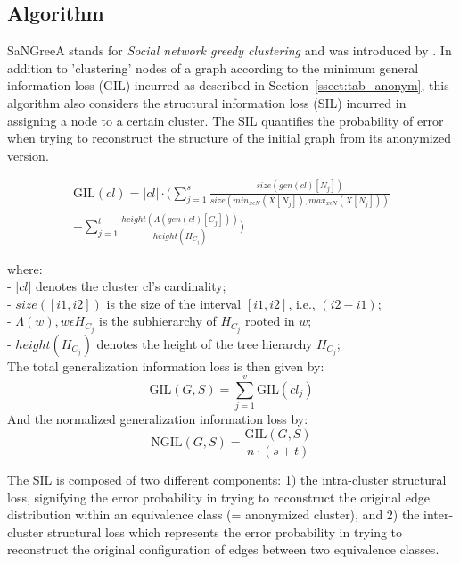 \documentclass{llncs}
\providecommand{\abs}[1]{\lvert#1\rvert}
\begin{document}
\subsection{Algorithm}
\label{ssect:algorithm}

SaNGreeA stands for \textit{Social network greedy clustering} and was introduced by \cite{campan2009data}. In addition to 'clustering' nodes of a graph according to the minimum general information loss (GIL) incurred as described in Section~\ref{ssect:tab_anonym}, this algorithm also considers the structural information loss (SIL) incurred in assigning a node to a certain cluster. The SIL quantifies the probability of error when trying to reconstruct the structure of the initial graph from its anonymized version.

\begin{equation*}
\begin{split}
\text{GIL}(cl) = \abs{cl} \cdot (\sum_{j=1}^{s} \frac{size(gen(cl)[N_j])}{size(min_{x \epsilon N} (X[N_j]), max_{x \epsilon N} (X[N_j]))} \\ 
+ \sum_{j=1}^{t} \frac{height(\Lambda(gen(cl)[C_j]))}{height(H_{C_j})})    
\end{split}    
\end{equation*}


where:\\
- $\abs{cl}$ denotes the cluster cl's cardinality; \\
- $size([i1,i2])$ is the size of the interval $[i1,i2]$, i.e., $(i2-i1)$; \\
- $\Lambda(w), w \epsilon H_{C_j}$ is the subhierarchy of $H_{C_j}$ rooted in $w$; \\
- $height(H_{C_j})$ denotes the height of the tree hierarchy $H_{C_j}$; \\


The total generalization information loss is then given by:
\begin{equation*}
\text{GIL}(G,S) = \sum_{j=1}^{v} \text{GIL}(cl_j)
\end{equation*}
And the normalized generalization information loss by:
\begin{equation*}
\text{NGIL}(G,S) = \frac{\text{GIL}(G,S)}{n \cdot (s+t)}
\end{equation*}

The SIL is composed of two different components: 1) the intra-cluster structural loss, signifying the error probability in trying to reconstruct the original edge distribution within an equivalence class (= anonymized cluster), and 2) the inter-cluster structural loss which represents the error probability in trying to reconstruct the original configuration of edges between two equivalence classes.
\end{document}
